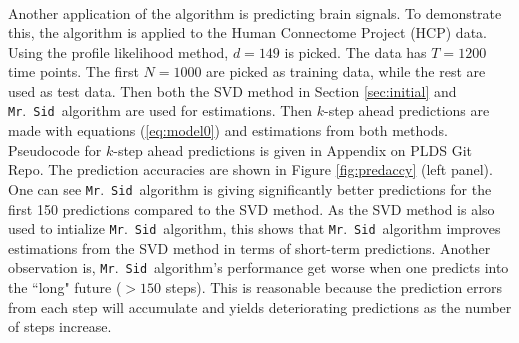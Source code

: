 \documentclass[fleqn,12pt]{article}
\let\oldref\ref
\renewcommand{\ref}[1]{(\oldref{#1})}
\newcommand{\mrsid}{{\sc \texttt{Mr}.~\texttt{Sid}}}
\begin{document}
\begin{center}
\[\begin{array}{lll}
\end{array}
\]
\label{fig:3d}
\end{center}

Another application of the algorithm is predicting brain signals. To demonstrate this, the algorithm is applied to the Human Connectome Project (HCP) data.
%
Using the profile likelihood method, $d=149$ is picked. The data has $T=1200$ time points. The first $N = 1000$ are picked as training data, while the rest are used as test data. Then both the SVD method in Section \oldref{sec:initial} and \mrsid~algorithm are used for estimations. Then $k$-step ahead predictions are made with equations \ref{eq:model0} and estimations from both methods. Pseudocode for $k$-step ahead predictions is given in Appendix on PLDS Git Repo. The prediction accuracies are shown in Figure \oldref{fig:predaccy} (left panel). One can see \mrsid~algorithm is giving significantly better predictions for the first 150 predictions compared to the SVD method. As the SVD method is also used to intialize \mrsid~algorithm, this shows that \mrsid~algorithm improves estimations from the SVD method in terms of short-term predictions. Another observation is, \mrsid~algorithm's performance get worse when one predicts into the ``long" future ($>150$ steps). This is reasonable because the prediction errors from each step will accumulate and yields deteriorating predictions as the number of steps increase.
\end{document}
